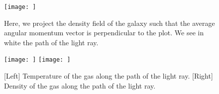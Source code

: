 \documentclass{article}
\begin{document}
\begin{figure}[h]
\begin{center}
  \texttt{[image: ]}
\caption{Here, we project the density field of the galaxy such that the average angular momentum vector is perpendicular to the plot. We see in white the path of the light ray.}
\label{galaxyperp}
\end{center}
\end{figure}

\begin{figure}[h]
\begin{center}
\texttt{[image: ]}
\texttt{[image: ]}
\caption{[Left] Temperature of the gas along the path of the light ray. [Right] Density of the gas along the path of the light ray.}
\label{denstempperp}
\end{center}
\end{figure}
\end{document}
